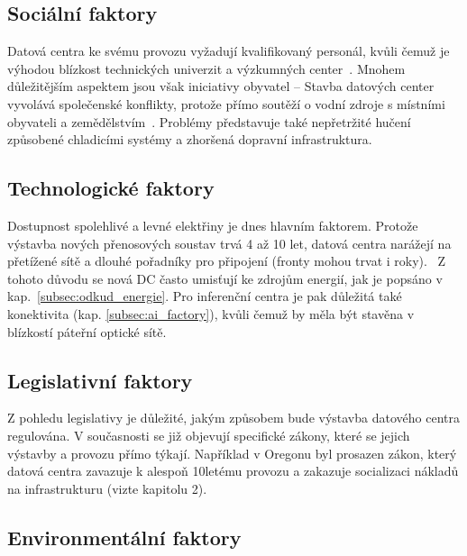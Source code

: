 \subsection{Sociální faktory}
\label{subsec:pestle_so}

Datová centra ke svému provozu vyžadují kvalifikovaný personál, kvůli čemuž je výhodou blízkost technických univerzit a výzkumných center~\cite{geng_data_2014}. Mnohem důležitějším aspektem jsou však iniciativy obyvatel -- Stavba datových center vyvolává společenské konflikty, protože přímo soutěží o vodní zdroje s místními obyvateli a zemědělstvím~\cite[s.~4]{shah_four_2026}. Problémy představuje také nepřetržité hučení způsobené chladicími systémy a zhoršená dopravní infrastruktura.

\subsection{Technologické faktory}
\label{subsec:pestle_te}

Dostupnost spolehlivé a levné elektřiny je dnes hlavním faktorem. Protože výstavba nových přenosových soustav trvá 4 až 10 let, datová centra narážejí na přetížené sítě a dlouhé pořadníky pro připojení (fronty mohou trvat i roky).~\cite{ginzburg-ganz_technical_2025, international_energy_agency_iea_energy_2025} Z tohoto důvodu se nová DC často umisťují ke zdrojům energií, jak je popsáno v kap.~\ref{subsec:odkud_energie}. Pro inferenční centra je pak důležitá také konektivita (kap. \ref{subsec:ai_factory}), kvůli čemuž by měla být stavěna v blízkostí páteřní optické sítě. 

\subsection{Legislativní faktory}
\label{subsec:pestle_le}

Z pohledu legislativy je důležité, jakým způsobem bude výstavba datového centra regulována. V současnosti se již objevují specifické zákony, které se jejich výstavby a provozu přímo týkají. Například v Oregonu byl prosazen zákon, který datová centra zavazuje k alespoň 10letému provozu a zakazuje socializaci nákladů na infrastrukturu (vizte kapitolu 2).~\cite[s.~19]{ginzburg-ganz_technical_2025}

\subsection{Environmentální faktory}
\label{subsec:pestle_en}

